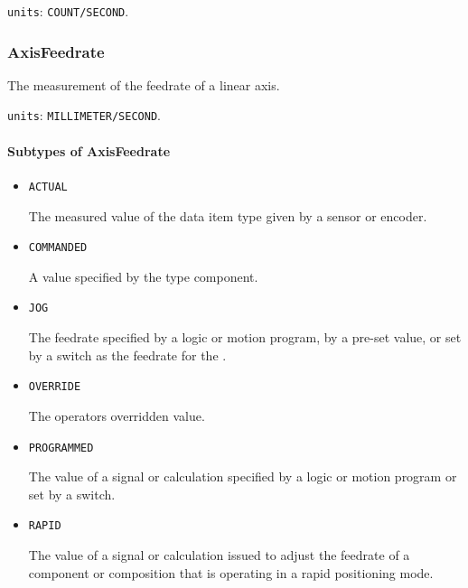 \texttt{units}: \texttt{COUNT/SECOND}.


\subsubsection{AxisFeedrate}
\label{sec:AxisFeedrate}



The measurement of the feedrate of a linear axis.


\texttt{units}: \texttt{MILLIMETER/SECOND}.

\paragraph{Subtypes of AxisFeedrate}\mbox{}
\label{sec:Subtypes of AxisFeedrate}

\begin{itemize}

\item \texttt{ACTUAL}


The measured value of the data item type given by a sensor or encoder.

\item \texttt{COMMANDED}


A value specified by the  type component.

\item \texttt{JOG}


The feedrate specified by a logic or motion program, by a pre-set value, or set by a switch as the feedrate for the . 

\item \texttt{OVERRIDE}


The operators overridden value.

\item \texttt{PROGRAMMED}


The value of a signal or calculation specified by a logic or motion program or set by a switch.

\item \texttt{RAPID}


The value of a signal or calculation issued to adjust the feedrate of a component or composition that is operating in a rapid positioning mode.


\end{itemize}









